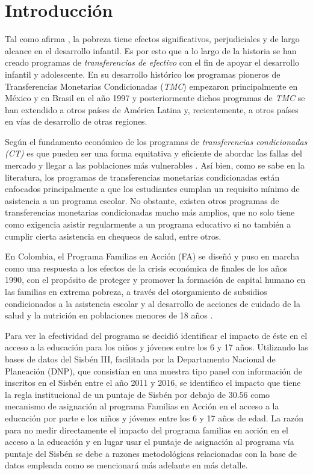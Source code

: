 \documentclass[AER]{AEA}
\begin{document}
\section{Introducción}
    
Tal como afirma \cite{deWalque2017CashDevelopment}, la pobreza tiene efectos significativos, perjudiciales y de largo alcance  en  el  desarrollo  infantil.   Es  por  esto que  a  lo  largo  de  la  historia  se  han  creado  programas  de \textit{transferencias de efectivo} con el fin de apoyar el desarrollo infantil y adolescente. En su desarrollo histórico los programas pioneros de Transferencias Monetarias Condicionadas (\textit{TMC}) empezaron principalmente en México y en Brasil en el año 1997 y posteriormente dichos programas de \textit{TMC} se han extendido a otros países de América Latina y, recientemente, a otros países en vías de desarrollo de otras regiones.
    
Según \cite{Sugiyama2011TheAmericas} el fundamento económico de los programas de \textit{transferencias condicionadas (CT)} es que pueden ser una forma equitativa y eficiente de abordar las fallas del mercado y llegar a las poblaciones más vulnerables \citep{Fiszbein2009ConditionalReport}. Así bien, como se sabe en la literatura, los programas de transferencias monetarias condicionadas están enfocados principalmente a que los estudiantes cumplan un requisito mínimo de asistencia a un programa escolar. No  obstante,  existen  otros  programas  de  transferencias  monetarias  condicionadas mucho  más amplios, que no solo tiene como exigencia asistir regularmente a un programa educativo si no también a cumplir cierta asistencia en chequeos de salud, entre otros.
     
En Colombia, el Programa Familias en Acción (FA) se diseñó y puso en marcha como una respuesta a los efectos de la crisis económica de finales de los años 1990, con el propósito de proteger y promover la formación de capital humano en las familias en extrema pobreza, a través del otorgamiento de subsidios condicionados a la asistencia escolar y al desarrollo de acciones de cuidado de la salud y la nutrición en poblaciones menores de 18 años \citep{Robles2018Las2001-2018}. 

Para ver la efectividad del programa se decidió identificar el impacto de éste en el acceso a la educación para los niños y jóvenes entre los 6 y 17 años. Utilizando las bases de datos del Sisbén III, facilitada por la Departamento Nacional de Planeación (DNP), que consistían en una muestra tipo panel con información de inscritos en el Sisbén entre el año 2011 y 2016, se identifico el impacto que tiene la regla institucional de un puntaje de Sisbén por debajo de $30.56$ como mecanismo de asignación al programa Familias en Acción en el acceso a la educación por parte e los niños y jóvenes entre los 6 y 17 años de edad. La razón para no medir directamente el impacto del programa familias en acción en el acceso a la educación y en lugar usar el puntaje de asignación al programa vía puntaje del Sisbén se debe a razones metodológicas relacionadas con la base de datos empleada como se mencionará más adelante en más detalle. 
\end{document}
